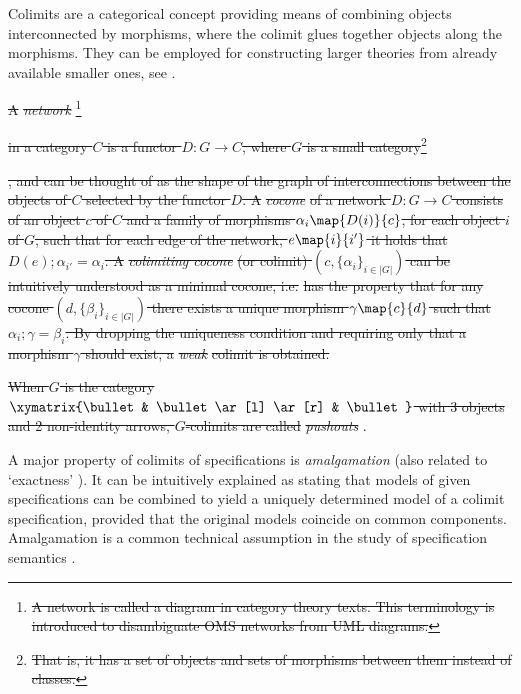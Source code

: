 \documentclass[10pt,fleqn,final]{scrreprt}
\newenvironment{definitions}[0]{\medskip }{}
\providecommand{\DIFadd}[1]{{\protect\color{blue}\uwave{#1}}} %
\providecommand{\DIFdel}[1]{{\protect\color{red}\sout{#1}}}                      %
\providecommand{\DIFaddbegin}{} %
\providecommand{\DIFaddend}{} %
\providecommand{\DIFdelbegin}{} %
\providecommand{\DIFdelend}{} %
\begin{document}
\begin{definitions}
Colimits are a categorical concept providing means of
combining objects interconnected by morphisms, where the colimit
glues together objects along the morphisms.
They can be employed for constructing larger theories from already available 
smaller ones, see \cite{GoguenBurstall92}. \DIFdelbegin %

\DIFdel{A }\emph{\DIFdel{network}}%
\footnote{\DIFdel{A network is called a diagram in category theory texts. This terminology is introduced to disambiguate OMS networks
from UML diagrams.}} %
\addtocounter{footnote}{-1}%
\DIFdel{in a category $C$ is 
a functor $D:G\to C$, where $G$ is a small category}\footnote{\DIFdel{That is, it has a set of objects and sets of morphisms between them
instead of classes.}}%
\addtocounter{footnote}{-1}%
\DIFdel{, and can be thought of as the shape of the graph of
interconnections between the objects of $C$ selected by the functor $D$. A }\emph{\DIFdel{cocone}} %
\DIFdel{of
a network $D:G\to C$ consists of an object $c$ of $C$ and a family of
morphisms $\alpha_i\map{D(i)}{c}$, for each object $i$ of $G$, such that for
each edge of the network, $e\map{i}{i'}$  it holds that 
$D(e);\alpha_{i'} = \alpha_{i}$. 
A }\emph{\DIFdel{colimiting cocone}} %
\DIFdel{(or colimit) $(c, \{\alpha_i\}_{i\in|G|})$ can be
intuitively understood as a minimal cocone, i.e.}%
\DIFdel{has the property that for any 
cocone $(d, \{\beta_i\}_{i\in |G|})$ there exists a unique morphism 
$\gamma\map{c}{d}$ such that $\alpha_i;\gamma = \beta_i$. By dropping the 
uniqueness condition and requiring only that a morphism $\gamma$ should exist,
 a }\emph{\DIFdel{weak}} %
\DIFdel{colimit is obtained. 
}%

\DIFdel{When $G$ is the category $\xymatrix{\bullet & \bullet \ar[l] \ar[r]
& \bullet }$ with 3 objects and 2 non-identity arrows,
$G$-colimits are
called  }\emph{\DIFdel{pushouts}}%
\DIFdelend \DIFaddbegin \DIFadd{For a formal mathematical definition,
see \ref{sec:colimits}}\DIFaddend .


A major property of colimits of specifications is \emph{amalgamation} (also related to `exactness' \cite{DGS91}). It can be intuitively explained as 
stating that models of given
specifications can be combined to yield a uniquely determined model of
a colimit specification, provided that the original models coincide on
common components. Amalgamation is a common technical assumption in the 
study of specification semantics
\cite{STbook}.


\end{definitions}
\end{document}
